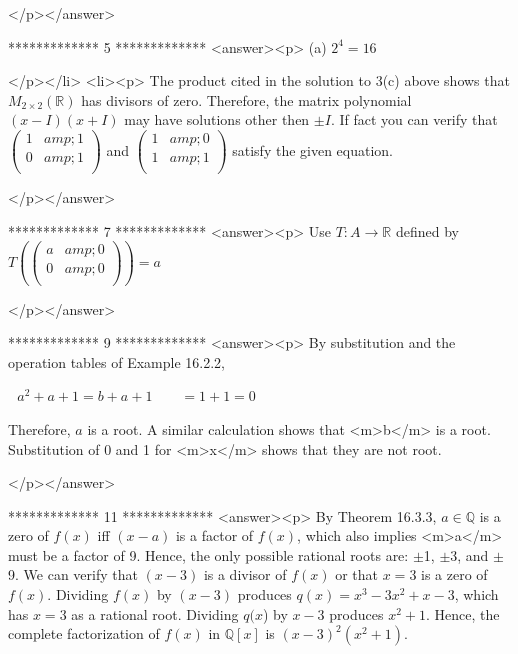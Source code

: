 </p></answer>


*************
5
*************
<answer><p> (a) \(2^4 = 16\)

</p></li>
<li><p>   The product cited in the solution to 3(c) above shows that \(M_{2\times 2}(\mathbb{R})\) has divisors of zero.  Therefore, the matrix polynomial
\((x-I)(x+I)\) may have solutions other then \(\pm I\).  If fact you can verify that \(\left(
\begin{array}{cc}
 1 &amp; 1 \\
 0 &amp; 1 \\
\end{array}
\right)\) and \(\left(
\begin{array}{cc}
 1 &amp; 0 \\
 1 &amp; 1 \\
\end{array}
\right)\) satisfy the given equation.

</p></answer>


*************
7
*************
<answer><p>   Use \(T:A\to \mathbb{R}\)  defined by \(T\left(\left(
\begin{array}{cc}
 a &amp; 0 \\
 0 &amp; 0 \\
\end{array}
\right) \right)= a\)

</p></answer>


*************
9
*************
<answer><p> By substitution and the operation tables of Example 16.2.2,



\(\text{       }a^2+ a + 1 = b + a+1 \quad \quad = 1+1 = 0\)



Therefore, \(a\) is a root.  A similar calculation shows that <m>b</m> is a root.   Substitution of 0 and 1 for <m>x</m> shows that they
are not root.

</p></answer>


*************
11
*************
<answer><p> By Theorem 16.3.3, \(a \in  \mathbb{Q}\) is a zero of \(f(x)\) iff \((x - a)\) is a factor of \(f(x)\), which also implies <m>a</m> must be
a factor of 9.   Hence, the only possible rational roots are: $\pm $1, $\pm $3, and $\pm $9.  We can verify that \((x - 3)\) is a divisor of
\(f(x)\) or that \(x = 3\) is a zero of \(f(x)\). Dividing \(f(x)\) by \((x - 3)\) produces \(q(x) =x^3-3x^2+x -3\), which has \(x = 3\) as a rational
root. Dividing \(q(x\)) by \(x-3\) produces \(x^2+1\). Hence, the complete factorization of \(f(x)\) in \(\mathbb{Q}[x]\) is \((x - 3)^2\left(x^2+
1\right)\).

